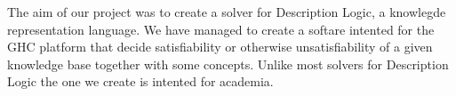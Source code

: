 The aim of our project was to create a solver for Description Logic, a
knowlegde representation language. We have managed to create a softare
intented for the GHC platform that decide satisfiability or otherwise
unsatisfiability of a given knowledge base together with some
concepts. Unlike most solvers for Description Logic the one we
create is intented for academia.

